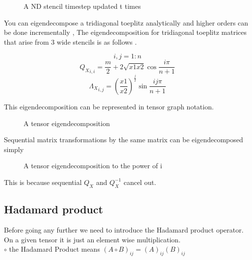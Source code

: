 \documentclass{article}
\begin{document}
\begin{figure}[H]
	\begin{mdframed}[backgroundcolor=myFigureColour]
		
		\caption{A ND stencil timestep updated t times}
	\end{mdframed}
\end{figure}

You can eigendecompose a tridiagonal toeplitz analytically and higher orders can be done incrementally \cite{bogoya2022fast},
The eigendecomposition for tridiagonal toeplitz matrices that arise from 3 wide stencils is as follows \cite{noschese2013tridiagonal}.


\[ i,j = 1:n\]
\[ {Q_X}_{i,i} = \frac{m}{2} + 2\sqrt{x1 x2}\cos{\frac{i\pi}{n+1}}\]
\[ {\Lambda_X}_{i,j} = (\frac{x1}{x2})^{\frac{j}{2}}\sin{\frac{ij\pi}{n+1}} \]

This eigendecomposition can be represented in tensor graph notation.

\begin{figure}[H]
	\begin{mdframed}[backgroundcolor=myFigureColour]
	
	\caption{A tensor eigendecomposition}
\end{mdframed}
\end{figure}

Sequential matrix transformations by the same matrix can be eigendecomposed simply

\begin{figure}[H]
	\begin{mdframed}[backgroundcolor=myFigureColour]
	
	\caption{A tensor eigendecomposition to the power of i}
	\label{tensor i}
\end{mdframed}
\end{figure}

This is because sequential $Q_X$ and $Q_X^{-1}$ cancel out.

\subsection{Hadamard product}

Before going any further we need to introduce the Hadamard product operator.
On a given tensor it is just an element wise multiplication. \\

$\circ$ the Hadamard Product means ${(A \circ B)}_{ij} = (A)_{ij} (B)_{ij}$ \\
\end{document}
